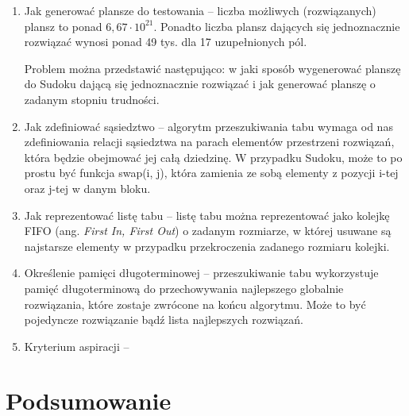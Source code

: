 \documentclass[]{project_report}
\begin{document}
	\begin{enumerate}
		\item Jak generować plansze do testowania -- liczba możliwych (rozwiązanych) plansz to ponad \(6,67 \cdot 10^{21}\)\cite{OEIS}. Ponadto liczba plansz dających się jednoznacznie rozwiązać wynosi ponad 49 tys. dla 17 uzupełnionych pól.
		
		Problem można przedstawić następująco: w jaki sposób wygenerować planszę do Sudoku dającą się jednoznacznie rozwiązać i jak generować planszę o zadanym stopniu trudności.
		
		\item Jak zdefiniować sąsiedztwo -- algorytm przeszukiwania tabu wymaga od nas zdefiniowania relacji sąsiedztwa na parach elementów przestrzeni rozwiązań, która będzie obejmować jej całą dziedzinę.  W przypadku Sudoku, może to po  prostu być funkcja swap(i, j), która zamienia ze sobą elementy z pozycji i-tej oraz j-tej w danym bloku.
		
		\item Jak reprezentować listę tabu -- listę tabu można reprezentować jako kolejkę FIFO (ang. \textit{First In, First Out}) o zadanym rozmiarze, w której usuwane są najstarsze elementy w przypadku przekroczenia zadanego rozmiaru kolejki.
		
		\item Określenie pamięci długoterminowej -- przeszukiwanie tabu wykorzystuje pamięć długoterminową do przechowywania najlepszego globalnie rozwiązania, które zostaje zwrócone na końcu algorytmu. Może to być pojedyncze rozwiązanie bądź lista najlepszych rozwiązań.
		
		\item Kryterium aspiracji --
		
	\end{enumerate}
	
	\section{Podsumowanie}
	
	
	\printbibliography
\end{document}
